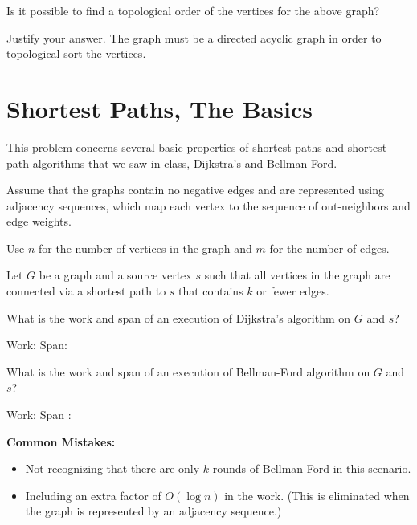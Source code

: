 \begin{problem}[4]

\asktf Is it possible to find a topological order of the vertices
for the above graph?

\solf


\ask 
Justify your answer.
\sol
The graph must be a directed acyclic graph in order to
topological sort the vertices.

\end{problem}



\section{Shortest Paths, The Basics}

This problem concerns several basic properties of shortest paths and
shortest path algorithms that we saw in class, Dijkstra's and
Bellman-Ford.

\begin{assumption}
Assume that the graphs contain no negative edges and are
represented using adjacency sequences,  which map each
vertex to the sequence of out-neighbors and edge weights.

Use $n$ for the number of vertices in the graph and $m$ for the number
of edges.
\end{assumption}



\begin{problem}

Let $G$ be a graph and a source vertex $s$ such that all vertices in
the graph are connected via a shortest path to $s$ that contains $k$
or fewer edges.

\ask
What is the work and span of an execution of Dijkstra's algorithm on
$G$ and $s$?

\solfin 
Work: 
Span: 

\ask
What is the work and span of an execution of Bellman-Ford algorithm on
$G$ and $s$?

\solfin
Work: 
Span :  

\notes
\textbf{Common Mistakes:}
\begin{itemize}
	\item Not recognizing that there are only $k$ rounds of Bellman Ford in this
  scenario.

	\item Including an extra factor of $O(\log n)$ in the work. (This is
  eliminated when the graph is represented by an adjacency sequence.)
\end{itemize}
\end{problem}

